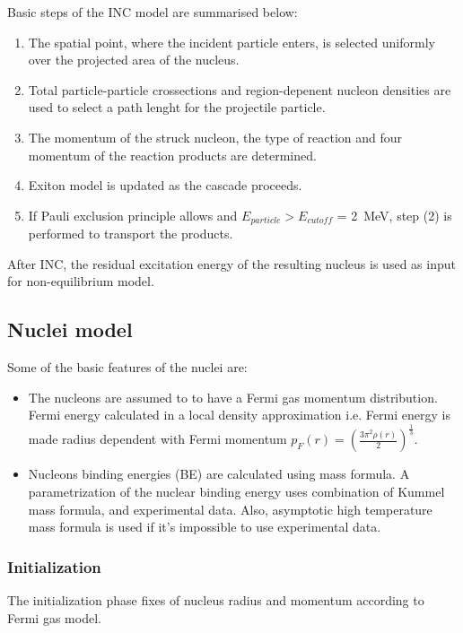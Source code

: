 Basic steps of the INC model are summarised below:

\begin{enumerate}
\item The spatial point, where the incident particle enters, is selected uniformly over the projected area of the nucleus.
\item Total particle-particle crossections and region-depenent nucleon densities are used to select a path lenght for the projectile particle.
\item The momentum of the struck nucleon, the type of reaction and four momentum of the reaction products are determined.
\item Exiton model is updated as the cascade proceeds.
\item If Pauli exclusion principle allows and $E_{particle} > E_{cutoff}$ = 2~MeV, step (2) is performed to transport the products.
\end{enumerate}

After INC, the residual excitation energy of the resulting nucleus is used as input for non-equilibrium model.

\subsection{Nuclei model}

Some of the basic features of the nuclei are:

\begin{itemize}
\item The nucleons are assumed to to have a Fermi gas momentum distribution. Fermi energy calculated in a local density approximation i.e. 
Fermi energy is made radius dependent with Fermi momentum $p_{F}(r) = (\frac{3 \pi^2 \rho(r)}{2})^\frac{1}{3}$.
\item Nucleons binding energies (BE) are calculated using mass formula.
A parametrization of the nuclear binding energy uses combination of Kummel mass formula, and
experimental data. Also, asymptotic high temperature mass formula is used if it's impossible to use experimental data.
\end{itemize}

\subsubsection{Initialization}
The initialization phase fixes of nucleus radius  and momentum according to Fermi gas model.

